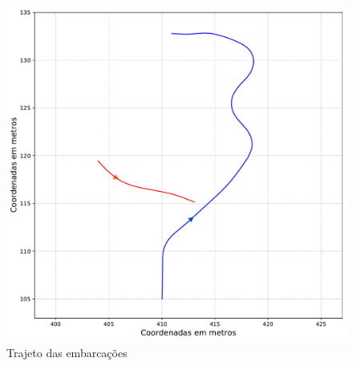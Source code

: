         \begin{figure}[H]
            \centering
            \includegraphics[scale=0.45]{fig/chap5/crossing_left_trajectory.pdf}
            \caption{Trajeto das embarcações}
            \label{fig:chap5_crossing_left_paths}
        \end{figure}
        
